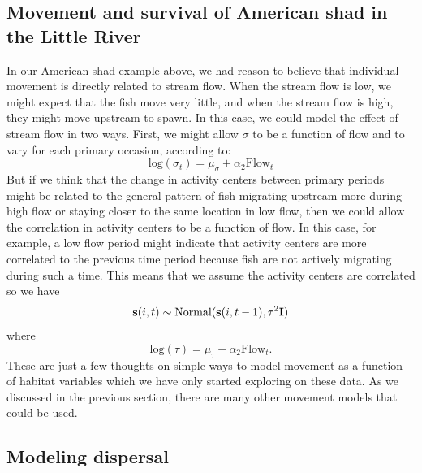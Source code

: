 \subsection{Movement and survival of American shad in the Little River}

In our American shad example above, we had reason to believe
that individual movement is directly related to stream flow.  When the
stream flow is low,
we might expect that the fish move very little, and when the stream
flow is high, they might
move upstream to spawn. In this case,
we could model the effect of stream flow in two ways.  First, we might allow $\sigma$
to be a function of flow and to vary for each primary occasion, according to:
\[
 \mbox{log}(\sigma_t) = \mu_{\sigma} + \alpha_2 \mbox{Flow}_t
\]
But if we think that the change in activity centers between primary periods might be related to the
general pattern of fish migrating upstream more during high flow or staying closer to the same location
in low flow, then we could allow the correlation in activity centers to be a function of flow.  In this
case, for example, a low flow period might indicate that activity centers are more correlated to the previous
time period because fish are not actively migrating during such a time.
This means that we assume the
activity centers are correlated so we have
\[
{\bf s}(i,t) \sim \mbox{Normal}({\bf
  s}(i,t-1), \tau^{2} {\bf I})
\]
where
\[
\mbox{log}(\tau) = \mu_{\tau} + \alpha_2 \mbox{Flow}_t.
\]
These are just a few thoughts on simple ways to model movement as a
function of habitat variables which we have only started exploring on these data.
As we discussed in the previous section, there
are many other movement models that could be used.

\subsection{Modeling  dispersal}

